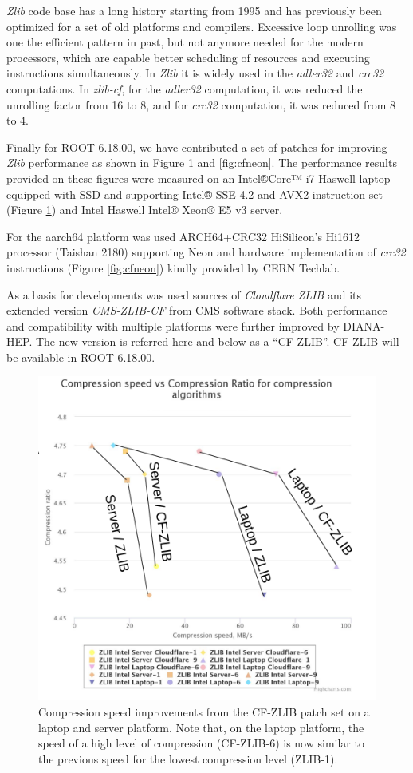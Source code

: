 \documentclass[12pt]{iopart}
\begin{document}
\textit{Zlib} code base has a long history starting from 1995 and has previously been optimized for a set of old platforms and compilers. Excessive loop unrolling was one the efficient pattern in past, but not anymore needed for the modern processors, which are capable better scheduling of resources and executing instructions simultaneously. In \textit{Zlib} it is widely used in the \textit{adler32} and \textit{crc32} computations. In \textit{zlib-cf}, for the \textit{adler32} computation, it was reduced the unrolling factor from 16 to 8, and for \textit{crc32} computation, it was reduced from 8 to 4. 
 
 Finally for ROOT 6.18.00, we have contributed a set of patches for improving \textit{Zlib} performance as shown in Figure \ref{fig:cflaptop} and \ref{fig:cfneon}. The performance results provided on these figures were measured on an Intel®Core™ i7 Haswell laptop equipped with SSD and supporting Intel® SSE 4.2 and AVX2 instruction-set (Figure \ref{fig:cflaptop}) and Intel Haswell  Intel® Xeon® E5 v3 server.
 
 For the aarch64 platform was used ARCH64+CRC32 HiSilicon's Hi1612 processor (Taishan 2180) supporting Neon and hardware implementation of \textit{crc32} instructions (Figure \ref{fig:cfneon}) kindly provided by CERN Techlab. 

As a basis for developments was used sources of \textit{Cloudflare ZLIB} \cite{zlib-cf-sources} and its extended version \textit{CMS-ZLIB-CF} \cite{zlib-cf-cms} from CMS software stack. Both performance and compatibility with multiple platforms were further improved by DIANA-HEP. The new version is referred here and below as a “CF-ZLIB”. CF-ZLIB will be available in ROOT 6.18.00.

\begin{figure}[!ht]
\centering
\includegraphics[width=0.7\linewidth]{acat21.png}
\caption{Compression speed improvements from the CF-ZLIB patch set on a laptop and server platform.  Note that, on the laptop platform, the speed of a high level of compression (CF-ZLIB-6) is now similar to the previous speed for the lowest compression level (ZLIB-1).}
\label{fig:cflaptop}
\end{figure}
\end{document}
